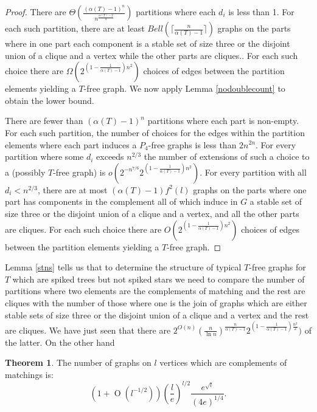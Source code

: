 \documentclass[12pt]{article}
\theoremstyle{definition}
\newtheorem{theorem}{Theorem}[section]
\DeclareMathOperator{\bo}{O}
\begin{document}
\begin{proof} 
There are $\Theta(\frac{(\alpha(T)-1)^n}{n^{\frac{\alpha(T)-2}{2}}})$ partitions where each $d_i$ is less than 1. 
For each such partition, there are at least $Bell(\lceil \frac{n}{\alpha(T)-1} \rceil)$ graphs on the parts where  in one part each component is 
a stable set of size three  or the disjoint union of a clique and a vertex while the other parts are cliques..   For each such choice   there are $\Omega(2^{(1-\frac{1}{\alpha(T)-1})n^2})$
choices of edges between the partition elements  yielding a $T$-free graph. 
We now apply Lemma  \ref{nodoublecount} to obtain the lower bound. 

There are fewer than $(\alpha(T)-1)^n$  partitions  where each part is non-empty. For each such partition, the number of choices for the edges within the partition
elements where each part induces a $P_4$-free graphs is less than $2n^{2n}$. For every partition where some $d_i$ exceeds $n^{2/3}$ 
the number of extensions of such a choice to a (possibly $T$-free graph)  is $o(2^{-n^{7/6}}2^{(1-\frac{1}{\alpha(T)-1})n^2})$. 
For every partition with all $d_i<n^{2/3}$, there are at most $(\alpha(T)-1)f^2(l)$ graphs on the parts where one  part has components in the complement all of which induce in $G$  
a stable set of size three  or the disjoint union of a clique and a vertex,  and all the other parts are cliques.   For each such choice  there are $O(2^{(1-\frac{1}{\alpha(T)-1})n^2})$
choices of edges between the partition elements  yielding a $T$-free graph. 
\end{proof}

Lemma \ref{stns} tells us that to determine the structure of typical $T$-free graphs for $T$ which are spiked trees but not spiked stars
we need to compare  the number of partitions where two elements are the complements of matching and the rest are cliques with  the number of those where 
one is the join of graphs which are either stable sets of size three or the disjoint union of a clique and a vertex and the rest are cliques.
We have just seen that there are  $2^{O(n)}(\frac{n}{\ln n})^{\frac{n}{\alpha(T)-1}}2^{(1-\frac{1}{\alpha(T)-1})\frac{n^2}{2}})$ of the latter.
On the other hand 


\begin{theorem}\cite{K97}
\label{K97lem}
The number of graphs on $l$ vertices which are complements of matchings is: 
\[
\left(1+\bo(l^{-1/2})\right) \left(\frac{l}{e}\right)^{l/2}\frac{e^{\sqrt{l}}}{(4e)^{1/4}}.
\] 
\end{theorem}
\end{document}
